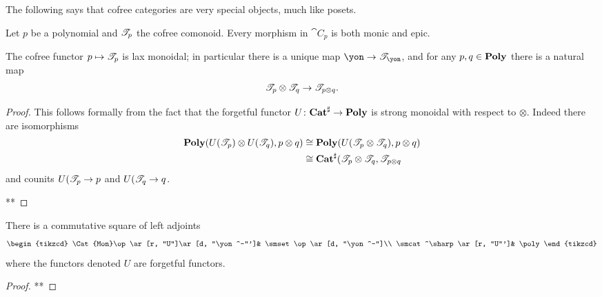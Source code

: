 \documentclass[DynamicalBook]{subfiles}
\begin{document}
The following says that cofree categories are very special objects, much like posets.

\begin{proposition}
Let $p$ be a polynomial and $\mathscr{T}_{p}$ the cofree comonoid. Every morphism in $\cat{C}_p$ is both monic and epic.
\end{proposition}



\begin{proposition}
The cofree functor $p\mapsto\mathscr{T}_{p}$ is lax monoidal; in particular there is a unique map $\yon\to\cofree{\yon}$, and for any $p,q\in\textbf{Poly}$ there is a natural map
\[
	\mathscr{T}_{p}\otimes\mathscr{T}_{q}\to\mathscr{T}_{p\otimes q}.
\]
\end{proposition}
\begin{proof}
This follows formally from the fact that the forgetful functor $U\colon\textbf{Cat}^\sharp\to\textbf{Poly}$ is strong monoidal with respect to $\otimes$. Indeed there are isomorphisms
\begin{align*}
	\textbf{Poly}(U(\mathscr{T}_{p})\otimes U(\mathscr{T}_{q}),p\otimes q)&\cong
	\textbf{Poly}(U(\mathscr{T}_{p}\otimes\mathscr{T}_{q}),p\otimes q)\\&\cong
	\textbf{Cat}^\sharp(\mathscr{T}_{p}\otimes\mathscr{T}_{q},\mathscr{T}_{p\otimes q}
\end{align*}
and counits $U(\mathscr{T}_{p}\to p$ and $U(\mathscr{T}_{q}\to q$.

**
\end{proof}

\begin{proposition}\label{prop.traj_mon_poly}
There is a commutative square of left adjoints
\[
\begin{tikzcd}
	\Cat{Mon}\op\ar[r, "U"]\ar[d, "\yon^-"']&
	\smset\op\ar[d, "\yon^-"]\\
	\smcat^\sharp\ar[r, "U"']&
	\poly
\end{tikzcd}
\]
where the functors denoted $U$ are forgetful functors.
\end{proposition}
\begin{proof}
**
\end{proof}
\end{document}
